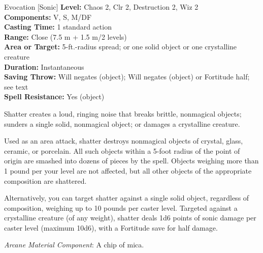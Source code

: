 {Evocation [Sonic]}
{
	\textbf{Level:}
	Chaos 2, Clr 2, Destruction 2, Wiz 2\\
	\textbf{Components:}
	V, S, M/DF\\
	\textbf{Casting Time:}
	1 standard action\\
	\textbf{Range:}
	Close (7.5 m + 1.5 m/2 levels)\\
	\textbf{Area or Target:}
	5-ft.-radius spread; or one solid object or one crystalline creature\\
	\textbf{Duration:}
	Instantaneous\\
	\textbf{Saving Throw:}
	Will negates (object); Will negates (object) or Fortitude half; see text\\
	\textbf{Spell Resistance:}
	Yes (object)\\
}
{
	Shatter creates a loud, ringing noise that breaks brittle, nonmagical objects; sunders a single solid, nonmagical object; or damages a crystalline creature.

	Used as an area attack, shatter destroys nonmagical objects of crystal, glass, ceramic, or porcelain. All such objects within a 5-foot radius of the point of origin are smashed into dozens of pieces by the spell. Objects weighing more than 1 pound per your level are not affected, but all other objects of the appropriate composition are shattered.

	Alternatively, you can target shatter against a single solid object, regardless of composition, weighing up to 10 pounds per caster level. Targeted against a crystalline creature (of any weight), shatter deals 1d6 points of sonic damage per caster level (maximum 10d6), with a Fortitude save for half damage.

	\textit{Arcane Material Component}:
	A chip of mica.

}
